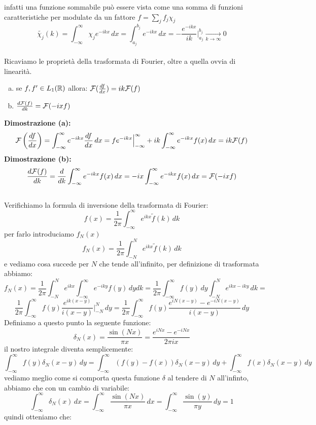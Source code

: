 infatti una funzione sommabile può essere vista come una somma di funzioni caratteristiche per modulate da un fattore $f = \sum_j f_j \chi_j$
\[\tilde{\chi_j}(k) = \int_{-\infty}^\infty \chi_j e^{-ikx}\,dx = \int_{a_j}^{b_j}e^{-ikx}\,dx = -\frac{e^{-ikx}}{ik}\bigg|_{a_j}^{b_j} \xrightarrow[k\to \infty]{} 0\]
\\
\newline
Ricaviamo le proprietà della trasformata di Fourier, oltre a quella ovvia di linearità.
\begin{enumerate}[a)]
\item se $f,f'\in L_1(\mathbb{R})$ allora:  $\mathcal{F}(\frac{d f}{d x}) = ik\mathcal{F}(f)$
\item $\frac{d \mathcal{F}(f)}{d k} = \mathcal{F}(-ixf)$
\end{enumerate}
\textbf{Dimostrazione (a):}\\
\[\mathcal{F}\left(\frac{d f}{d x}\right)= \int_{-\infty}^\infty e^{-ikx}\frac{d f}{d x}\,dx =fe^{-ikx}\Big|_{-\infty}^\infty+ik \int_{-\infty}^\infty e^{-ikx}f(x)\,dx =  ik\mathcal{F}(f) \]
\textbf{Dimostrazione (b):}\\
\[\frac{d \mathcal{F}(f)}{d k} =  \frac{d}{dk}\int_{-\infty}^\infty e^{-ikx}f(x)\,dx = -ix \int_{-\infty}^\infty e^{-ikx}f(x)\,dx  =  \mathcal{F}(-ixf)\]
\\
Verifichiamo la formula di inversione della trasformata di Fourier:
\[f(x) = \frac{1}{2\pi}\int_{-\infty}^\infty e^{ikx}\tilde{f}(k)\,dk\]
per farlo introduciamo $f_N(x)$
\[f_N(x) = \frac{1}{2\pi}\int_{-N}^N e^{ikx}\tilde{f}(k)\,dk\]
e vediamo cosa succede per $N$ che tende all'infinito, per definizione di trasformata abbiamo:
\[f_N(x) = \frac{1}{2\pi}\int_{-N}^N e^{ikx}\int_{-\infty}^\infty e^{-iky}f(y)\,dydk = \frac{1}{2\pi}\int_{-\infty}^\infty f(y)\,dy\int_{-N}^N e^{ikx-iky}\,dk = \]
\[\frac{1}{2\pi}\int_{-\infty}^\infty f(y) \frac{e^{ik(x-y)}}{i(x-y)}\bigg|_{-N}^N \,dy =  \frac{1}{2\pi}\int_{-\infty}^\infty f(y) \frac{e^{iN(x-y)}-e^{-iN(x-y)}}{i(x-y)}\,dy \]
Definiamo a questo punto la seguente funzione:
\[\delta_N(x) = \frac{\sin(Nx)}{\pi x} = \frac{e^{iNx}-e^{-iNx}}{2\pi ix}\]
il nostro integrale diventa semplicemente:
\[\int_{-\infty}^\infty f(y) \delta_N(x-y)\,dy = \int_{-\infty}^\infty (f(y)-f(x))\delta_N(x-y)\,dy + \int_{-\infty}^\infty f(x) \delta_N(x-y)\,dy \]
vediamo meglio come si comporta questa funzione $\delta$ al tendere di $N$ all'infinto, abbiamo che con un cambio di variabile:
\[\int_{-\infty}^\infty \delta_N(x)\,dx =\int_{-\infty}^\infty \frac{\sin(Nx)}{\pi x}\,dx  = \int_{-\infty}^\infty \frac{\sin(y)}{\pi y}\,dy = 1\]
quindi otteniamo che:
